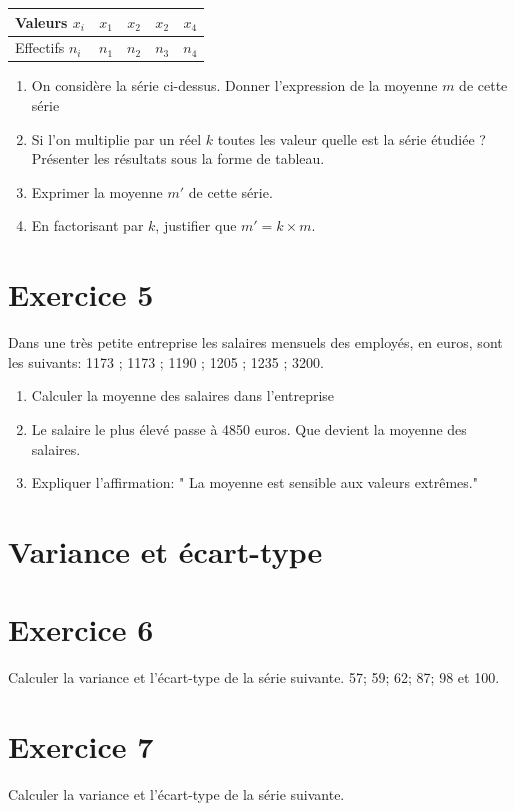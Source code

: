 \documentclass[french]{article}
\begin{document}
 \begin{tabular}{| l | c | c | c | c |}
     \hline
     Valeurs $x_i$ & $x_1$ & $x_2$ & $x_2$ & $x_4$ \\ \hline
     Effectifs $n_i$ & $n_1$ & $n_2$ & $n_3$ & $n_4$ \\ 
     \hline
    \end{tabular}

\begin{enumerate}
\item On considère la série ci-dessus. Donner l'expression de la moyenne $m$ de cette série
\item Si l'on multiplie par un réel $k$ toutes les valeur quelle est la série étudiée ? Présenter les résultats sous la forme de tableau.
\item Exprimer la moyenne $m'$ de cette série.
\item En factorisant par $k$, justifier que $m'=k \times m$. 
\end{enumerate}

\section*{Exercice 5}

Dans une très petite entreprise les salaires mensuels des employés, en euros, sont les suivants: 1173 ; 1173 ; 1190 ; 1205 ; 1235 ; 3200.

\begin{enumerate}
\item Calculer la moyenne des salaires dans l'entreprise
\item Le salaire le plus élevé passe à 4850 euros. Que devient la moyenne des salaires.
\item Expliquer l'affirmation: " La moyenne est sensible aux valeurs extrêmes." 
\end{enumerate}

\section{Variance et écart-type}

\section*{Exercice 6}
Calculer la variance et l'écart-type de la série suivante. 57; 59; 62; 87; 98 et 100.
\section*{Exercice 7}
Calculer la variance et l'écart-type de la série suivante.
\end{document}
